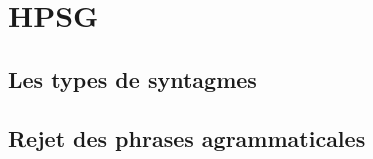 %
\section{HPSG}

\subsection{Les types de syntagmes}




\subsection{Rejet des phrases agrammaticales}


